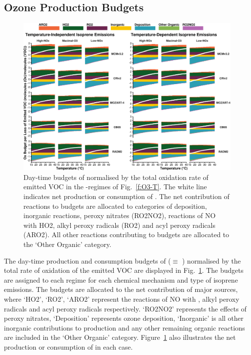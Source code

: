 \subsection{Ozone Production Budgets} \label{ss:r_budgets}
\begin{figure}[t]%
    \centering%
    \caption{Day-time budgets of  normalised by the total oxidation rate of emitted VOC in the -regimes of Fig.~\ref{f:O3-T}. The white line indicates net production or consumption of . The net contribution of reactions to  budgets are allocated to categories of deposition, inorganic reactions, peroxy nitrates (RO2NO2), reactions of NO with HO2, alkyl peroxy radicals (RO2) and acyl peroxy radicals (ARO2). All other reactions contributing to  budgets are allocated to the `Other Organic' category.}%
    \label{f:ozone_budgets}%
    \includegraphics[width = \textwidth]{img/Ox_budgets}%
\end{figure}
% 
The day-time production and consumption budgets of  ($\equiv$ ) normalised by the total rate of oxidation of the emitted VOC are displayed in Fig.~\ref{f:ozone_budgets}.
The  budgets are assigned to each  regime for each chemical mechanism and type of isoprene emissions.
The budgets are allocated to the net contribution of major sources, where `HO2', `RO2', `ARO2' represent the reactions of NO with , alkyl peroxy radicals and acyl peroxy radicals respectively.
`RO2NO2' represents the effects of peroxy nitrates, `Deposition' represents ozone deposition, `Inorganic' is all other inorganic contributions to  production and any other remaining organic reactions are included in the `Other Organic' category.
Figure~\ref{f:ozone_budgets} also illustrates the net production or consumption of  in each case.

